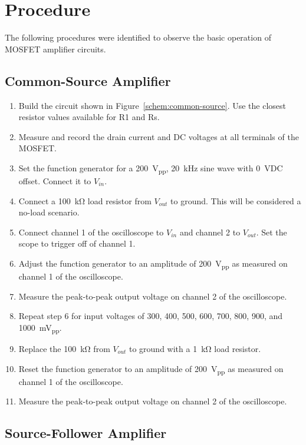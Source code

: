 \section{Procedure}
\label{sec:procedure}

The following procedures were identified to observe the basic operation of MOSFET amplifier circuits.

\subsection{Common-Source Amplifier}

\begin{enumerate}
\item Build the circuit shown in Figure~\ref{schem:common-source}.  Use the closest resistor values available for R1 and Rs.
\item Measure and record the drain current and DC voltages at all terminals of the MOSFET.
\item Set the function generator for a \SI{200}{V_{pp}}, \SI{20}{kHz} sine wave with \SI{0}{VDC} offset.  Connect it to $V_{in}$.
\item Connect a \SI{100}{\kilo\ohm} load resistor from $V_{out}$ to ground.  This will be considered a no-load scenario.
\item Connect channel 1 of the oscilloscope to $V_{in}$ and channel 2 to $V_{out}$.  Set the scope to trigger off of channel 1.
\item Adjust the function generator to an amplitude of \SI{200}{V_{pp}} as measured on channel 1 of the oscilloscope.
\item Measure the peak-to-peak output voltage on channel 2 of the oscilloscope.
\item Repeat step 6 for input voltages of 300, 400, 500, 600, 700, 800, 900, and \SI{1000}{mV_{pp}}.
\item Replace the \SI{100}{\kilo\ohm} from $V_{out}$ to ground with a \SI{1}{\kilo\ohm} load resistor.
\item Reset the function generator to an amplitude of \SI{200}{V_{pp}} as measured on channel 1 of the oscilloscope.
\item Measure the peak-to-peak output voltage on channel 2 of the oscilloscope.
\end{enumerate}

\subsection{Source-Follower Amplifier}

